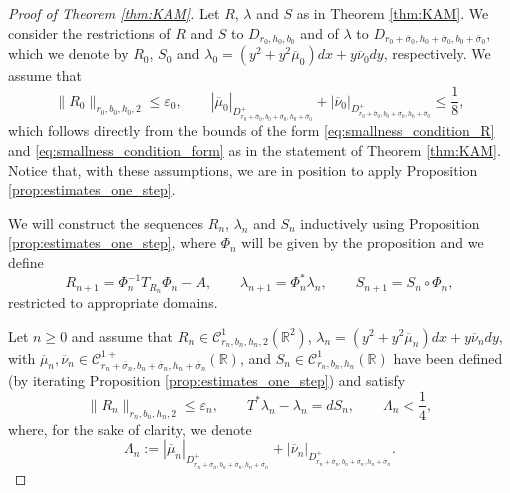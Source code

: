 \documentclass[10pt]{article}
\newcommand{\R}{\mathbb{R}}
\newcommand{\C}{\mathbb{C}}
\newcommand{\T}{\mathbb{T}}
\newcommand{\Domain}[3]{D_{#1, #2, #3}}
\newcommand{\DomainP}[3]{D_{#1, #2, #3}^+}
\begin{document}
\begin{proof}[Proof of Theorem \ref{thm:KAM}]
Let $R$, $\lambda$ and $S$ as in Theorem \ref{thm:KAM}. %
We consider the restrictions of $R$ and $S$ to $\Domain{r_0}{h_0}{b_0}$ and of $\lambda$ to $\Domain{r_0 + \overline \sigma_0}{h_0 + \overline \sigma_0}{b_0 + \overline \sigma_0}$,  which we denote by $R_0$, $S_0$ and $\lambda_0 = (y^2 + y^2 \overline \mu_0) dx + y \overline \nu_0 dy$, respectively. We assume that
\[
\|R_0\|_{r_0,b_0,h_0,2}\leq \varepsilon_0, \qquad  |\overline \mu_0|_{\DomainP{r_0 + \overline \sigma_0}{b_0 + \overline \sigma_0}{h_0 + \overline \sigma_0}} + |\overline \nu_0|_{\DomainP{r_0 + \overline \sigma_0}{b_0 + \overline \sigma_0}{h_0 + \overline \sigma_0}} \leq \frac{1}{8},
\]
which follows directly from the bounds of the form \eqref{eq:smallness_condition_R} and \eqref{eq:smallness_condition_form} as in the statement of Theorem \ref{thm:KAM}. Notice that, with these assumptions, we are in position to apply Proposition \ref{prop:estimates_one_step}.

 We will construct the sequences $R_n$, $\lambda_n$ and $S_n$ inductively using Proposition \ref{prop:estimates_one_step}, where $\Phi_{n}$ will be given by the proposition and we define 
 \[R_{n + 1} = \Phi_n^{-1} T_{R_n} \Phi_n - A, \qquad \lambda_{n + 1} = \Phi_n^{*} \lambda_n, \qquad S_{n + 1} = S_n \circ \Phi_n,\]
 restricted to appropriate domains. 
 
 Let $n\geq 0$ and assume that $R_n \in \mathscr C^1_{r_n,b_n,h_n, 2}(\R^2)$, $\lambda_n = (y^2 + y^2 \overline \mu_n) dx + y \overline \nu_n dy$, with $\overline \mu_n, \overline \nu_n \in  \mathscr C^{1+}_{r_n + \overline \sigma_n,b_n + \overline \sigma_n,h_n + \overline \sigma_n}(\R)$, and $S_n \in \mathscr C^1_{r_n,b_n,h_n}(\R)$ have been defined (by iterating Proposition \ref{prop:estimates_one_step}) and satisfy
\begin{equation}
    \label{eq:inductiion_hyp}
\|R_n\|_{r_n,b_n,h_n,2}\leq \varepsilon_n,  \qquad T^* \lambda_n - \lambda_n = dS_n, \qquad \Lambda_n  < \frac{1}{4},
\end{equation}
where, for the sake of clarity, we denote
\begin{equation}
\label{eq:Lambda}
\Lambda_n:=  |\overline \mu_n|_{\DomainP{r_n + \overline \sigma_n}{b_n + \overline \sigma_n}{h_n + \overline \sigma_n}} + |\overline \nu_n|_{\DomainP{r_n + \overline \sigma_n}{b_n + \overline \sigma_n}{h_n + \overline \sigma_n}}. %
\end{equation}


\end{proof}
\end{document}
